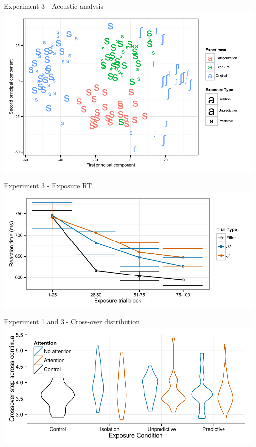 \documentclass{beamer}
\begin{document}
\begin{frame}{Experiment 3 - Acoustic analysis}
\includegraphics[width=1.0\textwidth]{graphs/exp3_mds}
\end{frame}

\begin{frame}{Experiment 3 - Exposure RT}
\includegraphics[width=1.0\textwidth]{graphs/exp3_exprt}
\end{frame}

\begin{frame}{Experiment 1 and 3 - Cross-over distribution}
\includegraphics[width=1.0\textwidth]{graphs/exp13_xoverdist}
\end{frame}
\end{document}

